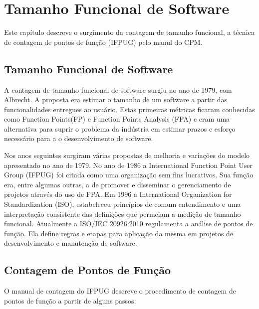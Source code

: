 \chapter[Tamanho Funcional de Software]{Tamanho Funcional de Software}

Este capítulo descreve o surgimento da contagem de tamanho funcional, a técnica de contagem de pontos de função (IFPUG) pelo manul do CPM.

\section{Tamanho Funcional de Software}

A contagem de tamanho funcional de software surgiu no ano de 1979, com Albrecht. A proposta era estimar o tamanho de um software a partir das funcionalidades entregues ao usuário. Estas primeiras métricas ficaram conhecidas como Function Points(FP)  e  Function Points Analysis (FPA)  e eram uma alternativa para suprir o problema da indústria em estimar prazos e esforço necessário para a o desenvolvimento de software.

Nos anos seguintes surgiram várias propostas de melhoria e variações do modelo apresentado no ano de 1979. No ano de 1986 a International Function Point User Group (IFPUG) foi criada como uma organização sem fins lucrativos. Sua função era, entre algumas outras, a de promover e disseminar o gerenciamento de projetos através do uso de FPA. Em 1996 a International Organization for Standardization (ISO), estabeleceu princípios de comum entendimento e uma interpretação consistente das  definições que permeiam a medição de tamanho funcional. Atualmente a ISO/IEC 20926:2010 regulamenta a análise de pontos de função. Ela define regras e etapas para aplicação da mesma em projetos de desenvolvimento e manutenção de software.

\section{Contagem de Pontos de Função}

O manual de contagem do IFPUG descreve o procedimento de contagem de pontos de função a partir de alguns passos:

